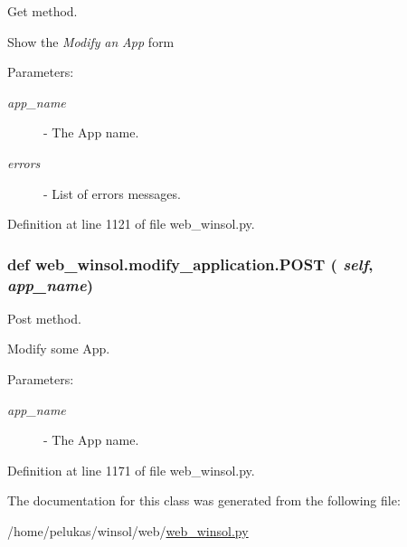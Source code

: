 Get method. 

Show the {\em Modify\/} {\em an\/} {\em App\/} form

\begin{Desc}
\item[Parameters:]
\begin{description}
\item[{\em app\_\-name}]- The App name. \item[{\em errors}]- List of errors messages. \end{description}
\end{Desc}


Definition at line 1121 of file web\_\-winsol.py.\hypertarget{classweb__winsol_1_1modify__application_8e743499bcafd9254a3d46558131eb57}{
\subsubsection[POST]{\setlength{\rightskip}{0pt plus 5cm}def web\_\-winsol.modify\_\-application.POST ( {\em self},  {\em app\_\-name})}}
\label{classweb__winsol_1_1modify__application_8e743499bcafd9254a3d46558131eb57}


Post method. 

Modify some App.

\begin{Desc}
\item[Parameters:]
\begin{description}
\item[{\em app\_\-name}]- The App name. \end{description}
\end{Desc}


Definition at line 1171 of file web\_\-winsol.py.

The documentation for this class was generated from the following file:\begin{CompactItemize}
\item 
/home/pelukas/winsol/web/\hyperlink{web__winsol_8py}{web\_\-winsol.py}\end{CompactItemize}
